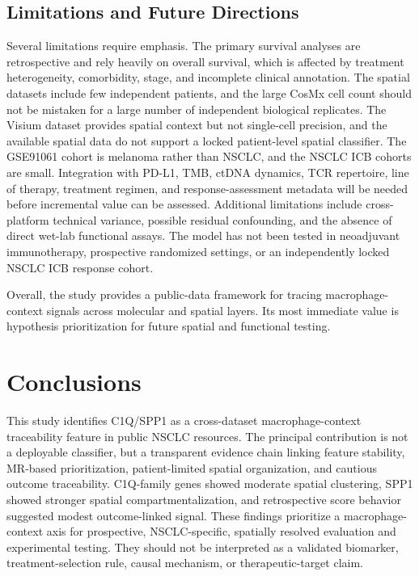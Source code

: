 \documentclass[pdflatex,sn-mathphys-num,referee,lineno]{sn-jnl}
\theoremstyle{thmstyleone}%
\theoremstyle{thmstyletwo}%
\theoremstyle{thmstylethree}%
\begin{document}
\subsection{Limitations and Future Directions}

Several limitations require emphasis. The primary survival analyses are retrospective and rely heavily on overall survival, which is affected by treatment heterogeneity, comorbidity, stage, and incomplete clinical annotation. The spatial datasets include few independent patients, and the large CosMx cell count should not be mistaken for a large number of independent biological replicates. The Visium dataset provides spatial context but not single-cell precision, and the available spatial data do not support a locked patient-level spatial classifier. The GSE91061 cohort is melanoma rather than NSCLC, and the NSCLC ICB cohorts are small. Integration with PD-L1, TMB, ctDNA dynamics, TCR repertoire, line of therapy, treatment regimen, and response-assessment metadata will be needed before incremental value can be assessed. Additional limitations include cross-platform technical variance, possible residual confounding, and the absence of direct wet-lab functional assays. The model has not been tested in neoadjuvant immunotherapy, prospective randomized settings, or an independently locked NSCLC ICB response cohort.

Overall, the study provides a public-data framework for tracing macrophage-context signals across molecular and spatial layers. Its most immediate value is hypothesis prioritization for future spatial and functional testing.

\section{Conclusions}\label{sec:conclusions}

This study identifies C1Q/SPP1 as a cross-dataset macrophage-context traceability feature in public NSCLC resources. The principal contribution is not a deployable classifier, but a transparent evidence chain linking feature stability, MR-based prioritization, patient-limited spatial organization, and cautious outcome traceability. C1Q-family genes showed moderate spatial clustering, SPP1 showed stronger spatial compartmentalization, and retrospective score behavior suggested modest outcome-linked signal. These findings prioritize a macrophage-context axis for prospective, NSCLC-specific, spatially resolved evaluation and experimental testing. They should not be interpreted as a validated biomarker, treatment-selection rule, causal mechanism, or therapeutic-target claim.
\end{document}
